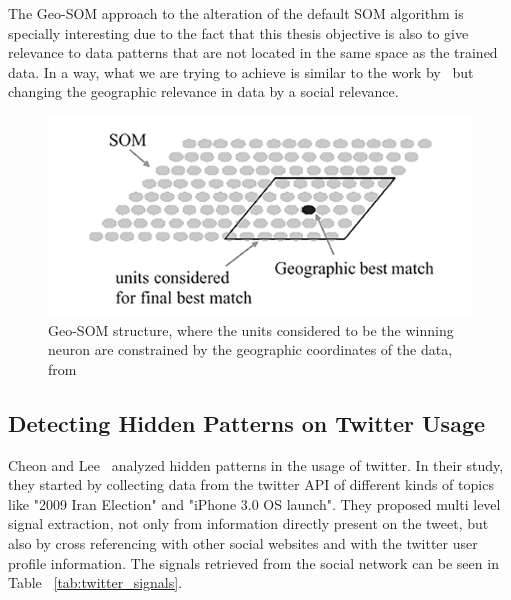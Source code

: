 The Geo-SOM approach to the alteration of the default \ac{SOM} algorithm is specially interesting due to the fact that this thesis objective is also to give relevance to data patterns that are not located in the same space as the trained data. In a way, what we are trying to achieve is similar to the work by~\citet{Bacao2005} but changing the geographic relevance in data by a social relevance.
\begin{figure}[tb]
  \begin{center}
    \includegraphics[]{images/6_geo-som.png}
  \end{center}
  \caption{Geo-SOM structure, where the units considered to be the winning neuron are constrained by the geographic coordinates of the data, from~\citet{Bacao2005}}
  \label{fig:geo_som}
\end{figure}

\subsection{Detecting Hidden Patterns on Twitter Usage} 
\label{sub:detecting_hidden_patterns_on_twitter_usage}
Cheon and Lee~\citep{Cheong2010} analyzed hidden patterns in the usage of twitter. In their study, they started by collecting data from the twitter API of different kinds of topics like "2009 Iran Election" and "iPhone 3.0 OS launch". They proposed multi level signal extraction, not only from information directly present on the tweet, but also by cross referencing with other social websites and with the twitter user profile information. The signals retrieved from the social network can be seen in Table ~\ref{tab:twitter_signals}.

